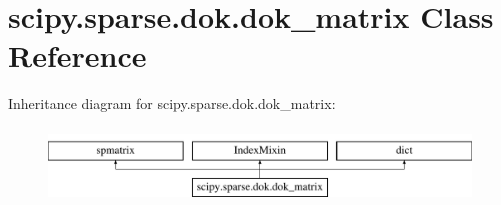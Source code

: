 \hypertarget{classscipy_1_1sparse_1_1dok_1_1dok__matrix}{}\section{scipy.\+sparse.\+dok.\+dok\+\_\+matrix Class Reference}
\label{classscipy_1_1sparse_1_1dok_1_1dok__matrix}
Inheritance diagram for scipy.\+sparse.\+dok.\+dok\+\_\+matrix\+:\begin{figure}[H]
\begin{center}
\leavevmode
\includegraphics[height=2.000000cm]{classscipy_1_1sparse_1_1dok_1_1dok__matrix}
\end{center}
\end{figure}
